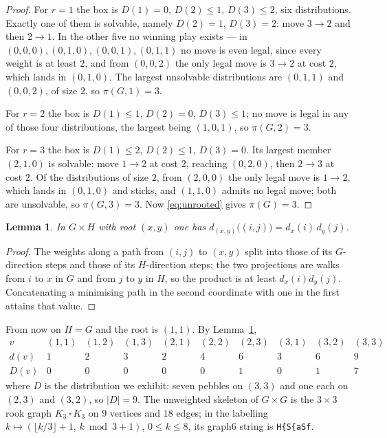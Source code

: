 \documentclass[11pt]{amsart}
\newtheorem{lemma}[theorem]{Lemma}
\theoremstyle{definition}
\begin{document}
\begin{proof}
For $r=1$ the box is $D(1)=0$, $D(2)\le1$, $D(3)\le2$, six distributions.
Exactly one of them is solvable, namely $D(2)=1$, $D(3)=2$: move $3\to2$ and
then $2\to1$. In the other five no winning play exists --- in
$(0,0,0),(0,1,0),(0,0,1),(0,1,1)$ no move is even legal, since every weight
is at least $2$, and from $(0,0,2)$ the only legal move is $3\to2$ at cost
$2$, which lands in $(0,1,0)$. The largest unsolvable distributions are
$(0,1,1)$ and $(0,0,2)$, of size $2$, so $\pi(G,1)=3$.

For $r=2$ the box is $D(1)\le1$, $D(2)=0$, $D(3)\le1$; no move is legal in
any of those four distributions, the largest being $(1,0,1)$, so
$\pi(G,2)=3$.

For $r=3$ the box is $D(1)\le2$, $D(2)\le1$, $D(3)=0$. Its largest member
$(2,1,0)$ is solvable: move $1\to2$ at cost $2$, reaching $(0,2,0)$, then
$2\to3$ at cost $2$. Of the distributions of size $2$, from $(2,0,0)$ the
only legal move is $1\to2$, which lands in $(0,1,0)$ and sticks, and $(1,1,0)$
admits no legal move; both are unsolvable, so $\pi(G,3)=3$. Now
\eqref{eq:unrooted} gives $\pi(G)=3$.
\end{proof}

\begin{lemma}\label{lem:dist}
In $G\times H$ with root $(x,y)$ one has
$d_{(x,y)}\big((i,j)\big)=d_x(i)\,d_y(j)$.
\end{lemma}

\begin{proof}
The weights along a path from $(i,j)$ to $(x,y)$ split into those of its
$G$-direction steps and those of its $H$-direction steps; the two projections
are walks from $i$ to $x$ in $G$ and from $j$ to $y$ in $H$, so the product
is at least $d_x(i)d_y(j)$. Concatenating a minimising path in the second
coordinate with one in the first attains that value.
\end{proof}

From now on $H=G$ and the root is $(1,1)$. By Lemma~\ref{lem:dist},
\[
\begin{array}{c|ccccccccc}
 v & (1,1) & (1,2) & (1,3) & (2,1) & (2,2) & (2,3) & (3,1) & (3,2) & (3,3)\\\hline
 d(v) & 1 & 2 & 3 & 2 & 4 & 6 & 3 & 6 & 9\\
 D(v) & 0 & 0 & 0 & 0 & 0 & 1 & 0 & 1 & 7
\end{array}
\]
where $D$ is the distribution we exhibit: seven pebbles on $(3,3)$ and one
each on $(2,3)$ and $(3,2)$, so $|D|=9$. The unweighted skeleton of
$G\times G$ is the $3\times3$ rook graph $K_3\,\square\,K_3$ on $9$ vertices
and $18$ edges; in the labelling $k\mapsto(\lfloor k/3\rfloor+1,\,k\bmod3+1)$,
$0\le k\le8$, its graph6 string is \texttt{H\{S\{aSf}.
\end{document}
